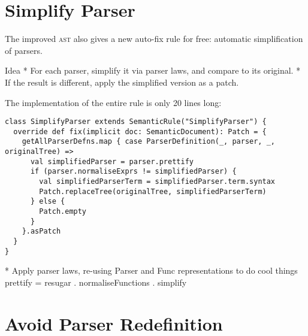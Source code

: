 \documentclass[../../main.tex]{subfiles}
\begin{document}
\section{Simplify Parser}
The improved  \textsc{ast} also gives a new auto-fix rule for free: automatic simplification of parsers.

Idea
* For each parser, simplify it via parser laws, and compare to its original.
* If the result is different, apply the simplified version as a patch.

The implementation of the entire rule is only 20 lines long:
\begin{verbatim}
class SimplifyParser extends SemanticRule("SimplifyParser") {
  override def fix(implicit doc: SemanticDocument): Patch = {
    getAllParserDefns.map { case ParserDefinition(_, parser, _, originalTree) =>
      val simplifiedParser = parser.prettify
      if (parser.normaliseExprs != simplifiedParser) {
        val simplifiedParserTerm = simplifiedParser.term.syntax
        Patch.replaceTree(originalTree, simplifiedParserTerm)
      } else {
        Patch.empty
      }
    }.asPatch
  }
}
\end{verbatim}
%

* Apply parser laws, re-using Parser and Func representations to do cool things
prettify = resugar . normaliseFunctions . simplify

\section{Avoid Parser Redefinition}
\end{document}
